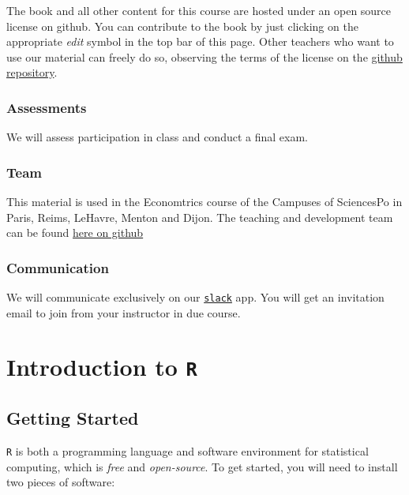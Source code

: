 \documentclass[]{book}
\theoremstyle{definition}
\theoremstyle{definition}
\theoremstyle{definition}
\theoremstyle{remark}
\begin{document}
The book and all other content for this course are hosted under an open
source license on github. You can contribute to the book by just
clicking on the appropriate \emph{edit} symbol in the top bar of this
page. Other teachers who want to use our material can freely do so,
observing the terms of the license on the
\href{https://github.com/ScPoEcon/ScPoEconometrics}{github repository}.

\subsection*{Assessments}\label{assessments}

We will assess participation in class and conduct a final exam.

\subsection*{Team}\label{team}

This material is used in the Economtrics course of the Campuses of
SciencesPo in Paris, Reims, LeHavre, Menton and Dijon. The teaching and
development team can be found
\href{https://github.com/orgs/ScPoEcon/teams/ugmetrics}{here on github}

\subsection*{Communication}\label{communication}

We will communicate exclusively on our
\href{https://econometrics-scpo.slack.com}{\texttt{slack}} app. You will
get an invitation email to join from your instructor in due course.

\chapter{\texorpdfstring{Introduction to
\texttt{R}}{Introduction to R}}\label{R-intro}

\section{Getting Started}\label{getting-started}

\texttt{R} is both a programming language and software environment for
statistical computing, which is \emph{free} and \emph{open-source}. To
get started, you will need to install two pieces of software:
\end{document}
